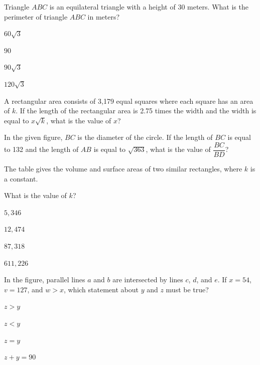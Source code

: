 \vfill
\noindent\begin{minipage}{\linewidth}
\par\smallskip
Triangle $ABC$ is an equilateral triangle with a height of 30 meters. What is the perimeter of triangle $ABC$ in meters?
\begin{satchoices}
  \item[A)] $60\sqrt{3}$
  \item[B)] $90$
  \item[C)] $90\sqrt{3}$
  \item[D)] $120\sqrt{3}$
\end{satchoices}
\end{minipage}
\vfill
\noindent\begin{minipage}{\linewidth}
\par\smallskip
A rectangular area consists of 3,179 equal squares where each square has an area of $k$. If the length of the rectangular area is 2.75 times the width and the width is equal to $x\sqrt{k}$, what is the value of $x$?
\end{minipage}
\vfill
\clearpage
\noindent\begin{minipage}{\linewidth}
\par\smallskip
In the given figure, $BC$ is the diameter of the circle. If the length of $BC$ is equal to 132 and the length of $AB$ is equal to $\sqrt{363}$, what is the value of $\dfrac{BC}{BD}$?
\satfig{\figcircleabcd}
\satnotetoscale
\end{minipage}
\vfill
\noindent\begin{minipage}{\linewidth}
\par\smallskip
The table gives the volume and surface areas of two similar rectangles, where $k$ is a constant.\par\smallskip What is the value of $k$?
\satfig{\figtblrectsim}
\begin{satchoices}
  \item[A)] $5{,}346$
  \item[B)] $12{,}474$
  \item[C)] $87{,}318$
  \item[D)] $611{,}226$
\end{satchoices}
\end{minipage}
\vfill
\noindent\begin{minipage}{\linewidth}
\par\smallskip
In the figure, parallel lines $a$ and $b$ are intersected by lines $c$, $d$, and $e$. If $x=54$, $v=127$, and $w>x$, which statement about $y$ and $z$ must be true?
\satfig{\figparallelabcde}
\satnotetoscale
\begin{satchoices}
  \item[A)] $z>y$
  \item[B)] $z<y$
  \item[C)] $z=y$
  \item[D)] $z+y=90$
\end{satchoices}
\end{minipage}
